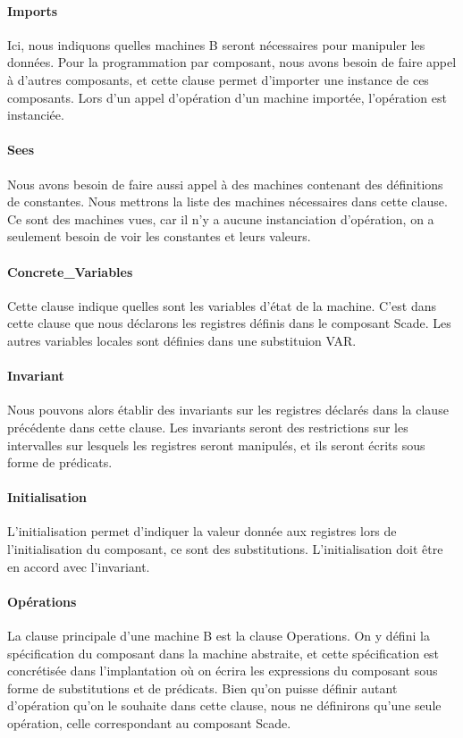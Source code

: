 \paragraph{Imports}
Ici, nous indiquons quelles machines B seront nécessaires pour
manipuler les données. Pour la programmation par composant, nous avons
besoin de faire appel à d'autres composants, et cette clause permet
d'importer une instance de ces composants. Lors d'un appel d'opération d'un machine
importée, l'opération est instanciée.

\paragraph{Sees}
Nous avons besoin de faire aussi appel à des machines contenant
des définitions de constantes. Nous mettrons la liste des machines nécessaires
dans cette clause. Ce sont des machines vues, car il n'y a aucune instanciation
d'opération, on a seulement besoin de voir les constantes et leurs valeurs.

\paragraph{Concrete\_Variables}
Cette clause indique quelles sont les variables d'état de la
machine. C'est dans cette clause que nous déclarons les registres
définis dans le composant Scade. Les autres variables locales sont définies dans
une substituion VAR.

\paragraph{Invariant}
Nous pouvons alors établir des invariants sur les registres déclarés dans la
clause précédente dans cette clause. Les invariants seront des restrictions sur les
intervalles sur lesquels les registres seront manipulés, et ils seront écrits
sous forme de prédicats.

\paragraph{Initialisation}
L'initialisation permet d'indiquer la valeur donnée aux registres lors
de l'initialisation du composant, ce sont des substitutions. L'initialisation doit être en accord
avec l'invariant.

\paragraph{Opérations}
La clause principale d'une machine B est la clause Operations. On y
défini la spécification du composant dans la machine abstraite, et
cette spécification est concrétisée dans l'implantation où on écrira
les expressions du composant sous forme de substitutions et de prédicats. Bien
qu'on puisse définir autant d'opération qu'on le souhaite dans cette clause,
nous ne définirons qu'une seule opération, celle correspondant au composant Scade.


